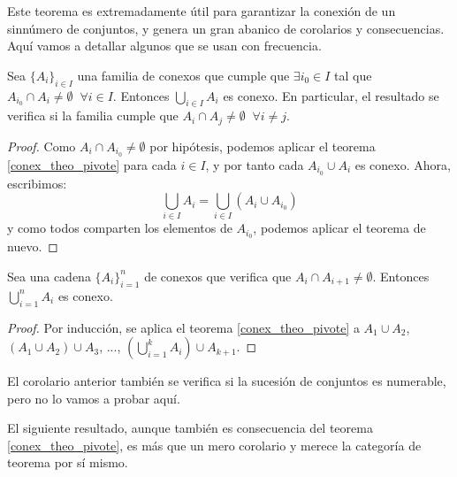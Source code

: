 Este teorema es extremadamente útil para garantizar la conexión de un sinnúmero de conjuntos, y genera un gran abanico de corolarios y consecuencias. Aquí vamos a detallar algunos que se usan con frecuencia.

\begin{cor}
	\label{conex_cor_pivote_corte_comun}
	Sea $\{A_i\}_{i\in I}$ una familia de conexos que cumple que $\exists i_0\in I$ tal que $A_{i_0}\cap A_i\neq\emptyset\;\;\forall i\in I$. Entonces $\bigcup_{i\in I} A_i$ es conexo. En particular, el resultado se verifica si la familia cumple que $A_i\cap A_j\neq\emptyset\;\;\forall i\neq j$.
	
	\begin{proof}
		Como $A_i\cap A_{i_0}\neq\emptyset$ por hipótesis, podemos aplicar el teorema \ref{conex_theo_pivote} para cada $i\in I$, y por tanto cada $A_{i_0}\cup A_i$ es conexo. Ahora, escribimos:
		\[\bigcup_{i\in I} A_i = \bigcup_{i\in I} (A_i\cup A_{i_0})\]
		y como todos comparten los elementos de $A_{i_0}$, podemos aplicar el teorema de nuevo.
	\end{proof}
\end{cor}

\begin{cor}
	Sea una cadena $\{A_i\}_{i=1}^n$ de conexos que verifica que $A_i\cap A_{i+1}\neq\emptyset$. Entonces $\bigcup_{i=1}^n A_i$ es conexo.
	
	\begin{proof}
		Por inducción, se aplica el teorema \ref{conex_theo_pivote} a $A_1\cup A_2$, $(A_1\cup A_2)\cup A_3$, ..., $\left(\bigcup_{i=1}^k A_i\right)\cup A_{k+1}$.
	\end{proof}
\end{cor}

\begin{obs}
	El corolario anterior también se verifica si la sucesión de conjuntos es numerable, pero no lo vamos a probar aquí.
\end{obs}

El siguiente resultado, aunque también es consecuencia del teorema \ref{conex_theo_pivote}, es más que un mero corolario y merece la categoría de teorema por sí mismo.

